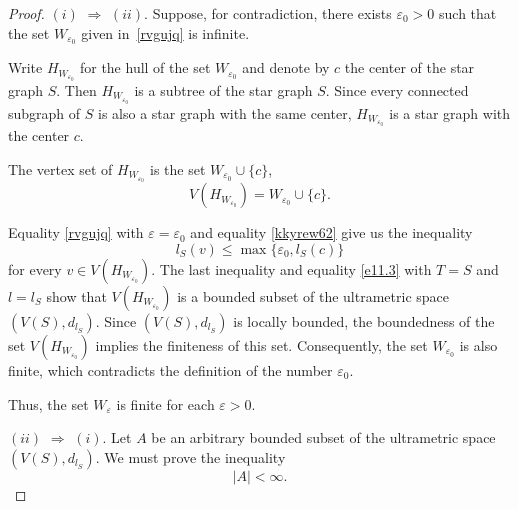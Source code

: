 \documentclass[pdflatex,sn-mathphys-num]{sn-jnl}%
\theoremstyle{thmstyletwo}%
\begin{document}
\begin{proof}

$(i)$ $\Rightarrow$ $(ii)$. Suppose, for contradiction, there exists $\varepsilon_0 > 0$ such that the set $W_{\varepsilon_0}$ given in~\eqref{rvgujq} is infinite.

Write $H_{W_{\varepsilon_0}}$ for the hull of the set $W_{\varepsilon_0}$ and denote by $c$ the center of the star graph $S$.
Then $H_{W_{\varepsilon_0}}$ is a subtree of the star graph $S$. Since every connected subgraph of $S$ is also a star graph with the same center, $H_{W_{\varepsilon_0}}$ is a star graph with the center $c$.

The vertex set of $H_{W_{\varepsilon_0}}$ is the set $W_{\varepsilon_0} \cup \{c\}$,
\begin{equation}\label{kkyrew62}
V(H_{W_{\varepsilon_0}}) = W_{\varepsilon_0} \cup \{c\}.
\end{equation}

Equality \eqref{rvgujq} with $\varepsilon = \varepsilon_0$ and equality \eqref{kkyrew62}  give us the inequality
\begin{equation*}
l_S(v) \leq \max\{\varepsilon_0, l_S(c)\}
\end{equation*}
for every $v \in V(H_{W_{\varepsilon_0}})$.
The last inequality and equality \eqref{e11.3} with $T = S$ and $l = l_S$ show that $V(H_{W_{\varepsilon_0}})$ is a bounded subset of the ultrametric space $(V(S), d_{l_S})$.
Since $(V(S), d_{l_S})$ is locally bounded, the boundedness of the set 
$V(H_{W_{\varepsilon_0}})$ implies the finiteness of this set. Consequently, the set $W_{\varepsilon_0}$ is also finite, which contradicts the definition of the number $\varepsilon_0$. 

Thus, the set $W_\varepsilon$ is finite for each $\varepsilon>0$.

$(ii)$ $\Rightarrow$ $(i)$. Let $A$ be an arbitrary bounded subset of the ultrametric space $(V(S), d_{l_S})$. We must prove the inequality
\begin{equation}\label{qswssej1}
|A| < \infty.
\end{equation}


\end{proof}
\end{document}
